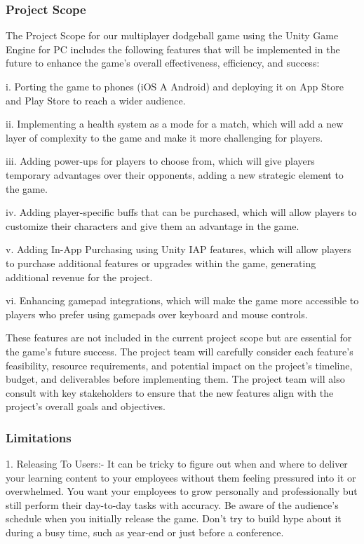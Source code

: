 \documentclass[12pt]{report}
\begin{document}
\subsubsection{Project Scope}
\justifying
\setlength{\parindent}{2em}
\setlength{\parskip}{0.5em}
\renewcommand{\baselinestretch}{1.5}
\normalsize \hspace{1.7cm} The Project Scope for our multiplayer dodgeball game using the Unity Game Engine for PC includes the following features that will be implemented in the future to enhance the game's overall effectiveness, efficiency, and success:

i. Porting the game to phones (iOS A Android) and deploying it on App Store and Play Store to reach a wider audience.

ii. Implementing a health system as a mode for a match, which will add a new layer of complexity to the game and make it more challenging for players.

iii. Adding power-ups for players to choose from, which will give players temporary advantages over their opponents, adding a new strategic element to the game.

iv. Adding player-specific buffs that can be purchased, which will allow players to customize their characters and give them an advantage in the game.

v. Adding In-App Purchasing using Unity IAP features, which will allow players to purchase additional features or upgrades within the game, generating additional revenue for the project.

vi. Enhancing gamepad integrations, which will make the game more accessible to players who prefer using gamepads over keyboard and mouse controls.

These features are not included in the current project scope but are essential for the game's future success. The project team will carefully consider each feature's feasibility, resource requirements, and potential impact on the project's timeline, budget, and deliverables before implementing them. The project team will also consult with key stakeholders to ensure that the new features align with the project's overall goals and objectives.

\subsubsection{Limitations}
\justifying
\setlength{\parindent}{2em}
\setlength{\parskip}{0.5em}
\renewcommand{\baselinestretch}{1.5}
\normalsize \hspace{1.7cm} 1. Releasing To Users:- It can be tricky to figure out when and where to deliver your learning content to your employees without them feeling pressured into it or overwhelmed. You want your employees to grow personally and professionally but still perform their day-to-day tasks with accuracy. Be aware of the audience’s schedule when you initially release the game. Don’t try to build hype about it during a busy time, such as year-end or just before a conference. 
\end{document}
